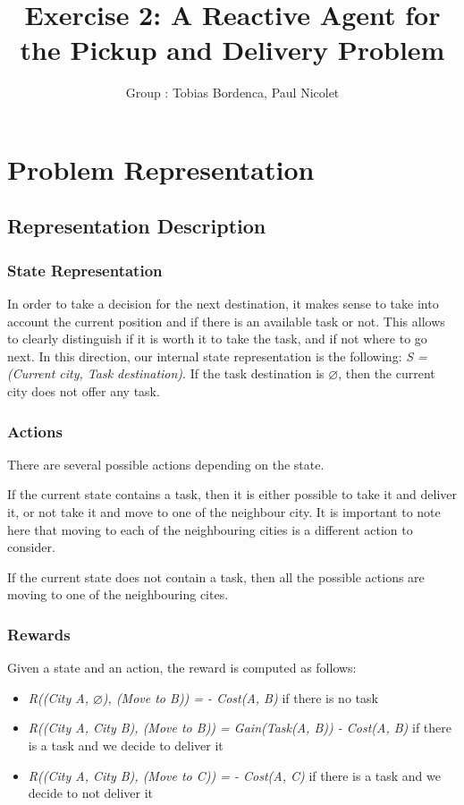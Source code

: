 \documentclass[11pt]{article}
\title{\bf Exercise 2: A Reactive Agent for the Pickup and Delivery Problem}
\author{Group \textnumero1: Tobias Bordenca, Paul Nicolet}
\begin{document}
\maketitle

\section{Problem Representation}

\subsection{Representation Description}
\subsubsection{State Representation}
In order to take a decision for the next destination, it makes sense to take into account the current position and if there is an available task or not. This allows to clearly distinguish if it is worth it to take the task, and if not where to go next. In this direction, our internal state representation is the following: \textit{S = (Current city, Task destination)}. If the task destination is $\varnothing$, then the current city does not offer any task.

\subsubsection{Actions}
There are several possible actions depending on the state. 

If the current state contains a task, then it is either possible to take it and deliver it, or not take it and move to one of the neighbour city. It is important to note here that moving to each of the neighbouring cities is a different action to consider.

If the current state does not contain a task, then all the possible actions are moving to one of the neighbouring cites.

\subsubsection{Rewards}
Given a state and an action, the reward is computed as follows:
\begin{itemize}
	\item \textit{R((City A, $\varnothing$), (Move to B)) = - Cost(A, B)} if there is no task
	\item \textit{R((City A, City B), (Move to B)) = Gain(Task(A, B)) - Cost(A, B)} if there is a task and we decide to deliver it
	\item \textit{R((City A, City B), (Move to C)) =  - Cost(A, C)} if there is a task and we decide to not deliver it
\end{itemize}
\end{document}
